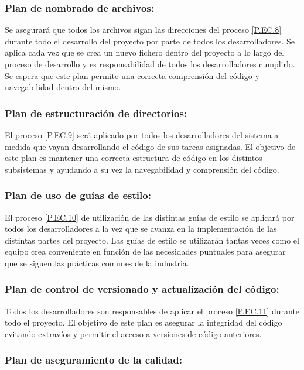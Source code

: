 \documentclass{article}
\begin{document}
\subsubsection{Plan de nombrado de archivos:} \label{PL.EC.6}

Se asegurará que todos los archivos sigan las direcciones del proceso \ref{P.EC.8} durante todo el desarrollo del proyecto por parte de todos los desarrolladores. Se aplica cada vez que se crea un nuevo fichero dentro del proyecto a lo largo del proceso de desarrollo y es responsabilidad de todos los desarrolladores cumplirlo. Se espera que este plan permite una correcta comprensión del código y navegabilidad dentro del mismo.

\subsubsection{Plan de estructuración de directorios: } \label{PL.EC.7}

El proceso \ref{P.EC.9} será aplicado por todos los desarrolladores del sistema a medida que vayan desarrollando el código de sus tareas asignadas. El objetivo de este plan es mantener una correcta estructura de código en los distintos subsistemas y ayudando a su vez la navegabilidad y comprensión del código.

\subsubsection{Plan de uso de guías de estilo: } \label{PL.EC.8}
El proceso \ref{P.EC.10} de utilización de las distintas guías de estilo se aplicará por todos los desarrolladores a la vez que se avanza en la implementación de las distintas partes del proyecto. Las guías de estilo se utilizarán tantas veces como el equipo crea conveniente en función de las necesidades puntuales para asegurar que se siguen las prácticas comunes de la industria.

\subsubsection{Plan de control de versionado y actualización del código: } \label{PL.EC.9}

Todos los desarrolladores son responsables de aplicar el proceso \ref{P.EC.11} durante todo el proyecto. El objetivo de este plan es asegurar la integridad del código evitando extravíos y permitir el acceso a versiones de código anteriores.

\subsubsection{Plan de aseguramiento de la calidad:} \label{PL.EC.10}
\end{document}
